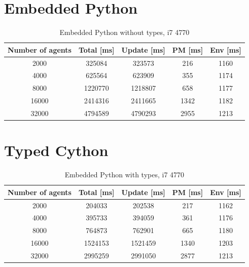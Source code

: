 \documentclass[12pt, a4paper]{report}
\begin{document}
\begin{appendices}
\section{Embedded Python}\label{appen-sec:bench-cython-pure}
\begin{table}[H]
  \begin{center}
    \begin{tabular}{|c||c||c|c|c|}
    \hline
    Number of agents & Total [ms] & Update [ms] & PM [ms] & Env [ms] \\ \hline
    2000             & 325084     & 323573      & 216     & 1160     \\
    4000             & 625564     & 623909      & 355     & 1174     \\
    8000             & 1220770    & 1218807     & 658     & 1177     \\
    16000            & 2414316    & 2411665     & 1342    & 1182     \\
    32000            & 4794589    & 4790293     & 2955    & 1213     \\ \hline
    \end{tabular}
    \caption {Embedded Python without types, i7 4770}
    \label{table:append-cython-pure}
  \end{center}
\end{table}

\section{Typed Cython}\label{appen-sec:bench-cython-typed}
\begin{table}[H]
  \begin{center}
    \begin{tabular}{|c||c||c|c|c|}
    \hline
    Number of agents & Total [ms] & Update [ms] & PM [ms] & Env [ms] \\ \hline
    2000             & 204033     & 202538      & 217     & 1162     \\
    4000             & 395733     & 394059      & 361     & 1176     \\
    8000             & 764873     & 762901      & 665     & 1180     \\
    16000            & 1524153    & 1521459     & 1340    & 1203     \\
    32000            & 2995259    & 2991050     & 2877    & 1213     \\ \hline
    \end{tabular}
    \caption {Embedded Python with types, i7 4770}
    \label{table:append-cython-types}
  \end{center}
\end{table}


\end{appendices}
\end{document}
